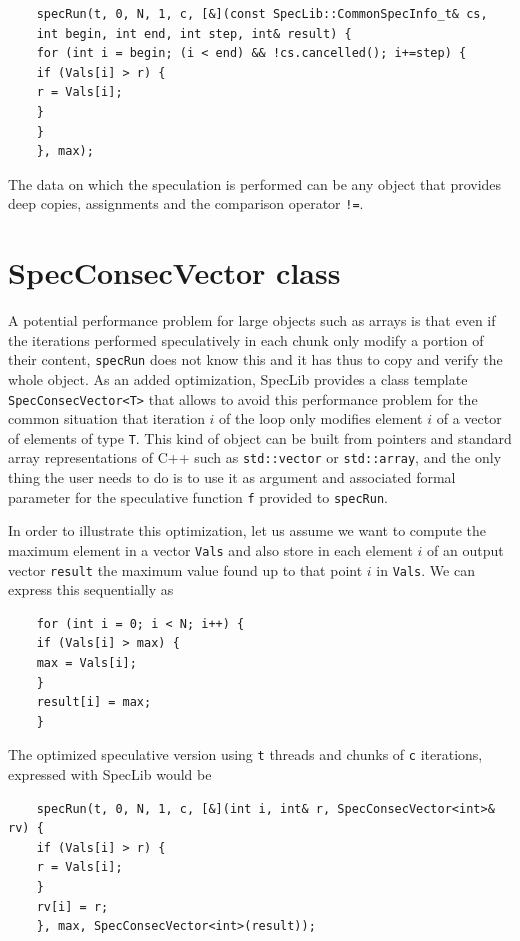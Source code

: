 \documentclass[11pt,a4paper]{article}
\begin{document}
	\begin{verbatim}
	specRun(t, 0, N, 1, c, [&](const SpecLib::CommonSpecInfo_t& cs, 
	int begin, int end, int step, int& result) {
	for (int i = begin; (i < end) && !cs.cancelled(); i+=step) {
	if (Vals[i] > r) {
	r = Vals[i];
	}
	}
	}, max);
	\end{verbatim}
	
	The data on which the speculation is performed can be any object that provides deep copies, assignments and the comparison operator {\tt !=}. 
	
	
	\section{SpecConsecVector class}\label{sec:SpecConsecVector}
	
	A potential performance problem for large objects such as arrays is that even if the iterations performed speculatively in each chunk only modify a portion of their content, {\tt specRun} does not know this and it has thus to copy and verify the whole object. As an added optimization, SpecLib provides a class template {\tt SpecConsecVector<T>} that allows to avoid this performance problem for the common situation that iteration $i$ of the loop only modifies element $i$ of a vector of elements of type {\tt T}. This kind of object can be built from pointers and standard array representations of C++ such as {\tt std::vector} or {\tt std::array}, and the only thing the user needs to do is to use it as argument and associated formal parameter for the speculative function {\tt f} provided to {\tt specRun}.
	
	In order to illustrate this optimization, let us assume we want to compute the maximum element in a vector {\tt Vals} and also store in each element $i$ of an output vector {\tt result} the maximum value found up to that point $i$ in {\tt Vals}. We can express this sequentially as
	
	\begin{verbatim}
	for (int i = 0; i < N; i++) {
	if (Vals[i] > max) {
	max = Vals[i];
	}
	result[i] = max;
	}
	\end{verbatim}
	
	The optimized speculative version using {\tt t} threads and chunks of {\tt c} iterations, expressed with SpecLib would be
	
	\begin{verbatim}
	specRun(t, 0, N, 1, c, [&](int i, int& r, SpecConsecVector<int>& rv) {
	if (Vals[i] > r) {
	r = Vals[i];
	}
	rv[i] = r;
	}, max, SpecConsecVector<int>(result));
	\end{verbatim}
	
\end{document}
